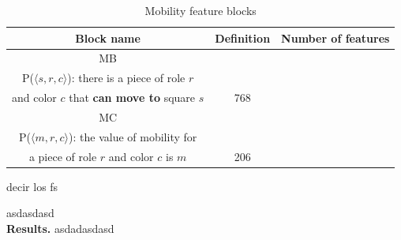 \begin{table}[H]
\caption{Mobility feature blocks}
\label{tab:mobility_blocks}
\centering

\begin{tabular}{ccc}
\toprule
\bf Block name & \bf Definition & \bf Number of features \\
\toprule
MB & \makecell{
\vspace{0.2cm}
($\featureset{Squares} \times \featureset{Roles} \times \featureset{Colors})_P$ \\
P($\langle s, r, c \rangle$): there is a piece of role $r$\\ and color $c$ that \textbf{can move to} square $s$
} & 768 \\
\toprule
MC & \makecell{
\vspace{0.2cm}
$(\{0, 1, \hdots\} \times \featureset{Roles} \times \featureset{Colors})_{P}$\\
P($\langle m, r, c \rangle$): the value of mobility for\\
a piece of role $r$ and color $c$ is $m$
} & 206 \\
\bottomrule
\end{tabular}
\end{table}

decir los fs


asdasdasd \\

\textbf{Results.} asdadasdasd
